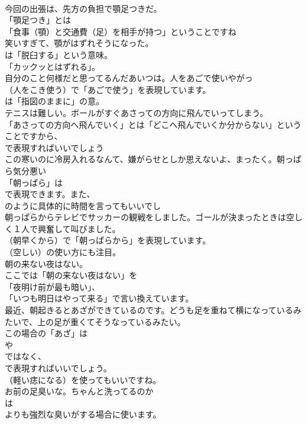 \documentclass[8pt]{extreport}
\begin{document}
\begin{CJK}{UTF8}{min}
\\	今回の出張は、先方の負担で顎足つきだ。 
\\	「顎足つき」とは
\\	「食事（顎）と交通費（足）を相手が持つ」ということですね	
\\	笑いすぎて、顎がはずれそうになった。 
\\	は「脱臼する」という意味。
\\	「カックッとはずれる」。	
\\	自分のこと何様だと思ってるんだあいつは。人をあごで使いやがっ 
\\	（人をこき使う）で「あごで使う」を表現しています。
\\	は「指図のままに」の意。	
\\	テニスは難しい。ボールがすぐあさっての方向に飛んでいってしまう。 
\\	「あさっての方向へ飛んでいく」とは「どこへ飛んでいくか分からない」ということですから、
\\	で表現すればいいでしょう	
\\	この寒いのに冷房入れるなんて、嫌がらせとしか思えないよ、まったく。朝っぱら気分悪い 
\\	「朝っぱら」は
\\	で表現できます。また、
\\	のように具体的に時間を言ってもいいでし	
\\	朝っぱらからテレビでサッカーの観戦をしました。ゴールが決まったときは空しく１人で興奮して叫びました。 
\\	（朝早くから）で「朝っぱらから」を表現しています。
\\	（空しい）の使い方にも注目。	
\\	朝の来ない夜はない。 
\\	ここでは「朝の来ない夜はない」を
\\	「夜明け前が最も暗い」、
\\	「いつも明日はやって来る」で言い換えています。	
\\	最近、朝起きるとあざができているのです。どうも足を重ねて横になっているみたいで、上の足が重くてそうなっているみたい。 
\\	この場合の「あざ」は 
\\	や 
\\	ではなく、
\\	で表現すればいいでしょう。
\\	（軽い痣になる）を使ってもいいですね。	
\\	お前の足臭いな。ちゃんと洗ってるのか 
\\	は
\\	よりも強烈な臭いがする場合に使います。	

\end{CJK}
\end{document}
